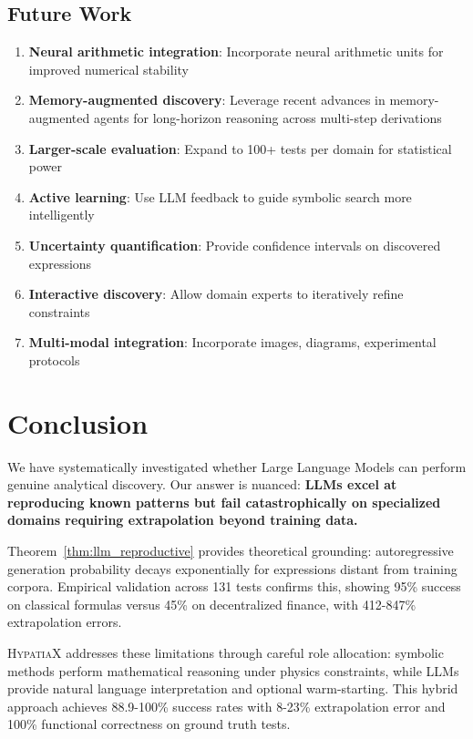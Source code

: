 \documentclass[twoside,11pt]{article}
\begin{document}
\subsection{Future Work}

\begin{enumerate}
\item \textbf{Neural arithmetic integration}: Incorporate neural arithmetic units \citep{trask2018neural} for improved numerical stability
\item \textbf{Memory-augmented discovery}: Leverage recent advances in memory-augmented agents \citep{yan2026memory} for long-horizon reasoning across multi-step derivations
\item \textbf{Larger-scale evaluation}: Expand to 100+ tests per domain for statistical power
\item \textbf{Active learning}: Use LLM feedback to guide symbolic search more intelligently
\item \textbf{Uncertainty quantification}: Provide confidence intervals on discovered expressions
\item \textbf{Interactive discovery}: Allow domain experts to iteratively refine constraints
\item \textbf{Multi-modal integration}: Incorporate images, diagrams, experimental protocols
\end{enumerate}

\section{Conclusion}

We have systematically investigated whether Large Language Models can perform genuine analytical discovery. Our answer is nuanced: \textbf{LLMs excel at reproducing known patterns but fail catastrophically on specialized domains requiring extrapolation beyond training data.}

Theorem~\ref{thm:llm_reproductive} provides theoretical grounding: autoregressive generation probability decays exponentially for expressions distant from training corpora. Empirical validation across 131 tests confirms this, showing 95\% success on classical formulas versus 45\% on decentralized finance, with 412-847\% extrapolation errors.

\textsc{HypatiaX} addresses these limitations through careful role allocation: symbolic methods perform mathematical reasoning under physics constraints, while LLMs provide natural language interpretation and optional warm-starting. This hybrid approach achieves 88.9-100\% success rates with 8-23\% extrapolation error and 100\% functional correctness on ground truth tests.
\end{document}
